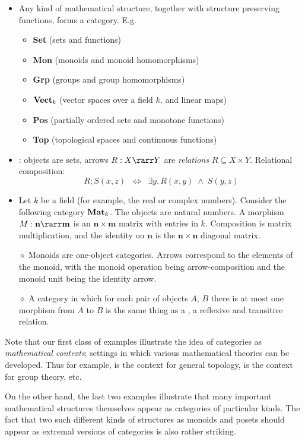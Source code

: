 \documentclass[12pt]{article}
\begin{document}
\begin{itemize}
\item {Any kind of mathematical structure, together with structure preserving functions, forms a category. E.g.}
\begin{itemize}
\item {\textbf{Set} (sets and functions)}
\item {\textbf{Mon} (monoids and monoid homomorphisms)}
\item {\textbf{Grp} (groups and group homomorphisms)}
\item {$\text{\textbf{Vect}}_{k}$ (vector spaces over a field $k$, and linear maps)}
\item {\textbf{Pos} (partially ordered sets and monotone functions)}
\item {\textbf{Top} (topological spaces and continuous functions)}
\end{itemize}
\item \Rel: objects are sets, arrows $R : X \rarr Y$ are \emph{relations} $R \subseteq X \times Y$.
Relational composition:
\[ R;S (x, z) \;\; \Longleftrightarrow \;\; \exists y. \, R(x, y) \; \wedge \; S(y, z) \]
\item Let $k$ be a field (for example, the real or complex numbers). Consider the following category $\text{\textbf{Mat}}_{k}$. The objects are natural numbers. A morphism $M : \mathbf{n} \rarr \mathbf{m}$ is an $\mathbf{n} \times \mathbf{m}$ matrix with entries in $k$. Composition is matrix multiplication, and the identity on $\mathbf{n}$ is the $\mathbf{n} \times \mathbf{n}$ diagonal matrix.
\item[$\diamond$] Monoids are one-object categories. Arrows correspond to the elements of the monoid, with the monoid operation being arrow-composition
    and the monoid unit being the identity arrow.
\item[$\diamond$] {A category in which for each pair of objects $A$, $B$ there is at most one morphism from $A$ to $B$ is the same thing as a
  , \ie a reflexive and transitive relation.}
\end{itemize}
Note that our first class of examples illustrate the idea of categories as \emph{mathematical contexts}; settings in which various mathematical theories can be developed. Thus for example,  is the context for general topology,  is the context for group theory, etc.

On the other hand, the last two examples illustrate that many important mathematical structures themselves appear as categories of particular kinds. The fact that two such different kinds of structures as monoids and posets should appear as extremal versions of categories is also rather striking.
\end{document}
